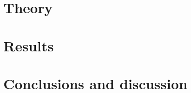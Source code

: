 \documentclass[x11names]{article}
\begin{document}
\section{Theory}
	

	

	

	

	


\section{Results}
	
	

		

	


\section{Conclusions and discussion}

	

	

	



% 
% 
\printbibliography
\end{document}
